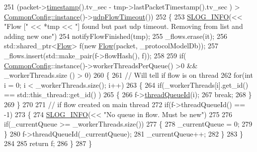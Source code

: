 \begin{DoxyCode}
251                 (packet->\hyperlink{class_vsid_common_1_1_i_pv4_packet_abef9e70b733c8e5718153cb032ea6f1a}{timestamp}().tv\_sec - tmp->lastPacketTimestamp().tv\_sec ) > 
      \hyperlink{class_vsid_common_1_1_common_config_a69c29458a786be527fe66470ac9fbbdb}{CommonConfig::instance}()->\hyperlink{class_vsid_common_1_1_common_config_a60ebee6b72a64b11236b893417f84e72}{udpFlowTimeout}())
252             \{
253                 \hyperlink{_logger_8h_a119c1c29ba35a8db38e2358e41167282}{SLOG\_INFO}(<< \textcolor{stringliteral}{"Flow ["} << *tmp << \textcolor{stringliteral}{"] found but past udp timeout. Removing from list
       and adding new one"})
254                 notifyFlowFinished(tmp);
255                 \_flows.erase(it);
256                 std::shared\_ptr<\hyperlink{class_vsid_common_1_1_flow}{Flow}>  f(new \hyperlink{class_vsid_common_1_1_flow}{Flow}(packet, \_protocolModelDb));
257                 \_flows.insert(std::make\_pair(f->flowHash(), f));
258 
259                 if( \hyperlink{class_vsid_common_1_1_common_config}{CommonConfig}::instance()->workerThreadsPerQueue() >0 && \_workerThreads.size
      () > 0)
260                 \{
261                     \textcolor{comment}{// Will tell if flow is on thread}
262                     \textcolor{keywordflow}{for}(\textcolor{keywordtype}{int} i = 0; i < \_workerThreads.size(); i++)
263                     \{
264                         \textcolor{keywordflow}{if}(\_workerThreads[i].get\_id() == std::this\_thread::get\_id() )
265                         \{
266                             f->\hyperlink{class_vsid_common_1_1_flow_a067c4a0fbf63c7295442c54898d9990d}{threadQueueId}(i);
267                             \textcolor{keywordflow}{break};
268                         \}
269                     \}
270 
271                     \textcolor{comment}{// if flow created on main thread}
272                     \textcolor{keywordflow}{if}(f->threadQueueId() == -1)
273                     \{
274                         \hyperlink{_logger_8h_a119c1c29ba35a8db38e2358e41167282}{SLOG\_INFO}(<< \textcolor{stringliteral}{"No queue in flow. Must be new"})
275                         
276                         if(\_currentQueue >= \_workerThreads.size())
277                         \{
278                             \_currentQueue = 0;
279                         \}
280                         f->threadQueueId(\_currentQueue);
281                         \_currentQueue++;
282                     \}
283                 \}
284 
285                 \textcolor{keywordflow}{return} f;
286             \}
287         \}

\end{DoxyCode}
